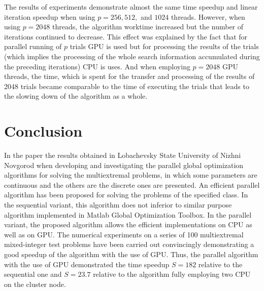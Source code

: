 \documentclass{llncs}
\begin{document}
The results of experiments demonstrate almost the same time speedup and linear iteration 
speedup when using $p=256, 512,$ and $1024$ threads. However, when using $p=2048$ 
threads, the algorithm worktime increased but the number of iterations continued to decrease. 
This effect was explained by the fact that for parallel running of $p$ trials GPU is used but for 
processing the results of the trials (which implies the processing of the whole search information 
accumulated during the preceding iterations) CPU is uses. And when employing $p=2048$ 
GPU threads, the time, which is spent for the transfer and processing of the results of 2048 
trials became comparable to the time of executing the trials that leads to the slowing down of 
the algorithm as a whole.


\section{Conclusion}
In the paper the results obtained in Lobachevsky State University of Nizhni Novgorod 
when developing and investigating the parallel global optimization algorithms for solving the 
multiextremal problems, in which some parameters are continuous and the others are the discrete 
ones are presented. 
An efficient parallel algorithm has been proposed for solving the problems of the specified class. 
In the sequential variant, this algorithm does not inferior to similar purpose algorithm 
implemented in Matlab Global Optimization Toolbox.
In the parallel variant, the proposed algorithm allows the efficient implementations on CPU as 
well as on GPU. 
The numerical experiments on a series of 100 multiextremal mixed-integer test problems have been carried out 
convincingly demonstrating a good speedup of the algorithm with the use of GPU.
Thus, the parallel algorithm with the use of GPU demonstrated the time speedup $S = 182$ 
relative to the sequential one and $S = 23.7$ relative to the algorithm fully employing two CPU on 
the cluster node.
\end{document}
